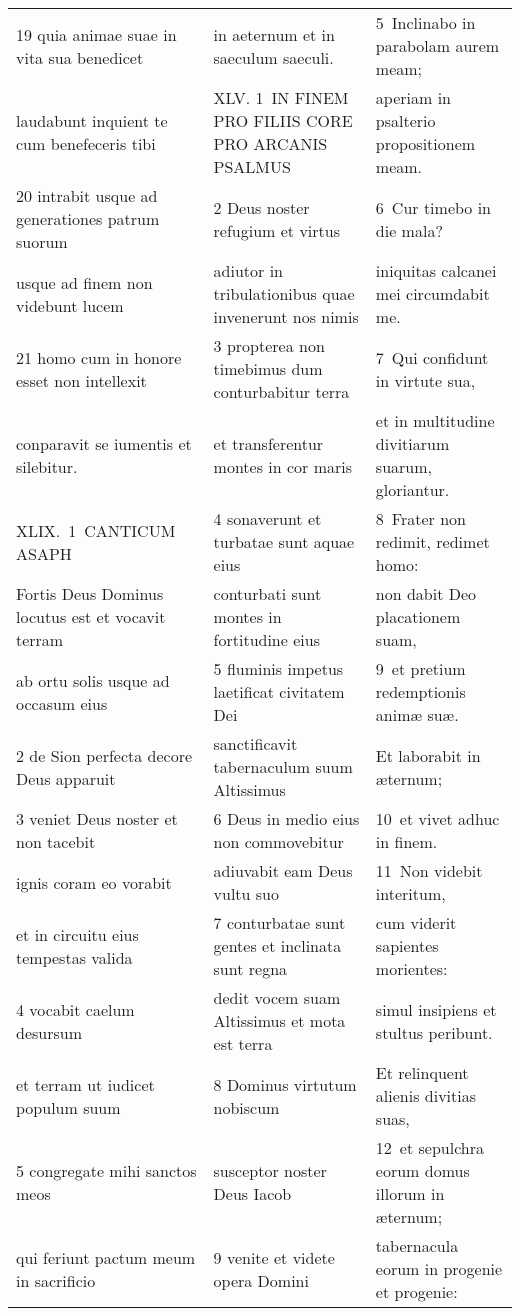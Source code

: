 \documentclass{article}
\begin{document}
\begin{longtable}{@{}p{}p{}p{}@{}}
19 quia animae suae in vita sua benedicet	&	in aeternum et in saeculum saeculi.	&	5 Inclinabo in parabolam aurem meam;	\\
laudabunt inquient te cum benefeceris tibi	&	XLV. 1 IN FINEM PRO FILIIS CORE PRO ARCANIS PSALMUS	&	aperiam in psalterio propositionem meam.	\\
20 intrabit usque ad generationes patrum suorum	&	2 Deus noster refugium et virtus	&	6 Cur timebo in die mala?	\\
usque ad finem non videbunt lucem	&	adiutor in tribulationibus quae invenerunt nos nimis	&	iniquitas calcanei mei circumdabit me.	\\
21 homo cum in honore esset non intellexit	&	3 propterea non timebimus dum conturbabitur terra	&	7 Qui confidunt in virtute sua,	\\
conparavit se iumentis et silebitur.	&	et transferentur montes in cor maris	&	et in multitudine divitiarum suarum, gloriantur.	\\
XLIX. 1 CANTICUM ASAPH	&	4 sonaverunt et turbatae sunt aquae eius	&	8 Frater non redimit, redimet homo:	\\
Fortis Deus Dominus locutus est et vocavit terram	&	conturbati sunt montes in fortitudine eius	&	non dabit Deo placationem suam,	\\
ab ortu solis usque ad occasum eius	&	5 fluminis impetus laetificat civitatem Dei	&	9 et pretium redemptionis animæ suæ.	\\
2 de Sion perfecta decore Deus apparuit	&	sanctificavit tabernaculum suum Altissimus	&	Et laborabit in æternum;	\\
3 veniet Deus noster et non tacebit	&	6 Deus in medio eius non commovebitur	&	10 et vivet adhuc in finem.	\\
ignis coram eo vorabit	&	adiuvabit eam Deus vultu suo	&	11 Non videbit interitum,	\\
et in circuitu eius tempestas valida	&	7 conturbatae sunt gentes et inclinata sunt regna	&	cum viderit sapientes morientes:	\\
4 vocabit caelum desursum	&	dedit vocem suam Altissimus et mota est terra	&	simul insipiens et stultus peribunt.	\\
et terram ut iudicet populum suum	&	8 Dominus virtutum nobiscum	&	Et relinquent alienis divitias suas,	\\
5 congregate mihi sanctos meos	&	susceptor noster Deus Iacob	&	12 et sepulchra eorum domus illorum in æternum;	\\
qui feriunt pactum meum in sacrificio	&	9 venite et videte opera Domini	&	tabernacula eorum in progenie et progenie:	\\

\end{longtable}
\end{document}
